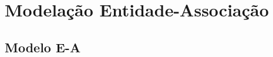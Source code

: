 \documentclass{article}
\begin{document}
\newpage



\tableofcontents
\newpage




\section{Modelação Entidade-Associação}

\subsection{Modelo E-A}
\noindent
{}
\end{document}
